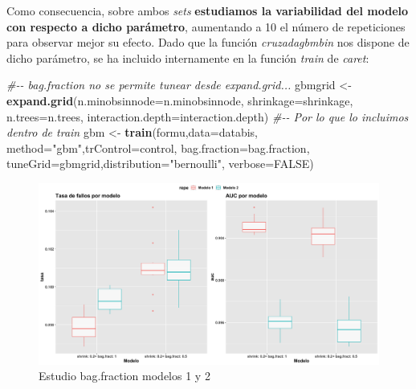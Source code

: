 \documentclass[
]{article}
\newenvironment{Shaded}{\begin{snugshade}}{\end{snugshade}}
\newcommand{\CommentTok}[1]{\textcolor[rgb]{0.56,0.35,0.01}{\textit{#1}}}
\newcommand{\DataTypeTok}[1]{\textcolor[rgb]{0.13,0.29,0.53}{#1}}
\newcommand{\KeywordTok}[1]{\textcolor[rgb]{0.13,0.29,0.53}{\textbf{#1}}}
\newcommand{\NormalTok}[1]{#1}
\newcommand{\OtherTok}[1]{\textcolor[rgb]{0.56,0.35,0.01}{#1}}
\newcommand{\StringTok}[1]{\textcolor[rgb]{0.31,0.60,0.02}{#1}}
\begin{document}
Como consecuencia, sobre ambos \emph{sets} \textbf{estudiamos la
variabilidad del modelo con respecto a dicho parámetro}, aumentando a 10
el número de repeticiones para observar mejor su efecto. Dado que la
función \emph{cruzadagbmbin} nos dispone de dicho parámetro, se ha
incluido internamente en la función \emph{train} de \emph{caret}:

\begin{Shaded}
\begin{Highlighting}[]
\CommentTok{\#{-}{-} bag.fraction no se permite tunear desde expand.grid...}
\NormalTok{gbmgrid <{-}}\StringTok{ }\KeywordTok{expand.grid}\NormalTok{(}\DataTypeTok{n.minobsinnode=}\NormalTok{n.minobsinnode, }\DataTypeTok{shrinkage=}\NormalTok{shrinkage,}
                      \DataTypeTok{n.trees=}\NormalTok{n.trees, }\DataTypeTok{interaction.depth=}\NormalTok{interaction.depth)}
\CommentTok{\#{-}{-} Por lo que lo incluimos dentro de train  }
\NormalTok{gbm    <{-}}\StringTok{ }\KeywordTok{train}\NormalTok{(formu,}\DataTypeTok{data=}\NormalTok{databis, }\DataTypeTok{method=}\StringTok{"gbm"}\NormalTok{,}\DataTypeTok{trControl=}\NormalTok{control,}
                \DataTypeTok{bag.fraction=}\NormalTok{bag.fraction, }\DataTypeTok{tuneGrid=}\NormalTok{gbmgrid,}\DataTypeTok{distribution=}\StringTok{"bernoulli"}\NormalTok{,}
                \DataTypeTok{verbose=}\OtherTok{FALSE}\NormalTok{)}
\end{Highlighting}
\end{Shaded}

\begin{figure}[h!]

{\centering \includegraphics[width=0.99\linewidth,height=0.99\textheight,]{./charts/gradient_boosting/05_gbm_bag_fraction} 

}

\caption{Estudio bag.fraction modelos 1 y 2}\label{fig:unnamed-chunk-111}
\end{figure}
\end{document}
